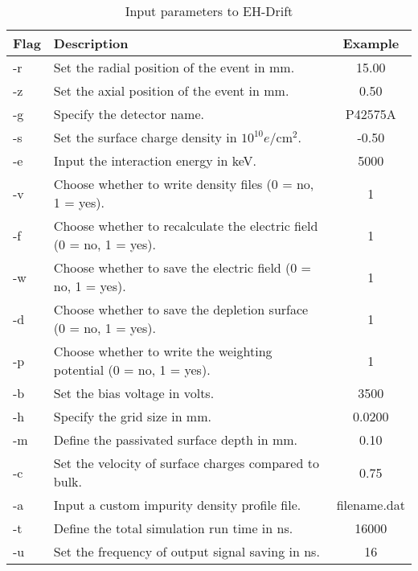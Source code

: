 \begin{table}[!htb]
    \centering
    \renewcommand{\arraystretch}{1.3} %
    \begin{tabular}{|l|p{10cm}|c|}
        \hline
        \textbf{Flag} & \textbf{Description} & \textbf{Example} \\ 
        \hline
        -r & Set the radial position of the event in mm. & 15.00 \\
        \hline
        -z & Set the axial position of the event in mm. & 0.50 \\
        \hline
        -g & Specify the detector name. & P42575A \\
        \hline
        -s & Set the surface charge density in $10^{10} e/\text{cm}^2$. & -0.50 \\
        \hline
        -e & Input the interaction energy in keV. & 5000 \\
        \hline
        -v & Choose whether to write density files (0 = no, 1 = yes). & 1 \\
        \hline
        -f & Choose whether to recalculate the electric field (0 = no, 1 = yes). & 1 \\
        \hline
        -w & Choose whether to save the electric field (0 = no, 1 = yes). & 1 \\
        \hline
        -d & Choose whether to save the depletion surface (0 = no, 1 = yes). & 1 \\
        \hline
        -p & Choose whether to write the weighting potential (0 = no, 1 = yes). & 1 \\
        \hline
        -b & Set the bias voltage in volts. & 3500 \\
        \hline
        -h & Specify the grid size in mm. & 0.0200 \\
        \hline
        -m & Define the passivated surface depth in mm. & 0.10 \\
        \hline
        -c & Set the velocity of surface charges compared to bulk. & 0.75 \\
        \hline
        -a & Input a custom impurity density profile file. & filename.dat \\
        \hline
        -t & Define the total simulation run time in ns. & 16000 \\
        \hline
        -u & Set the frequency of output signal saving in ns. & 16 \\
        \hline
    \end{tabular}
    \caption{Input parameters to EH-Drift}
    \label{ch3_tab_ehdrift_parameters}
\end{table}
